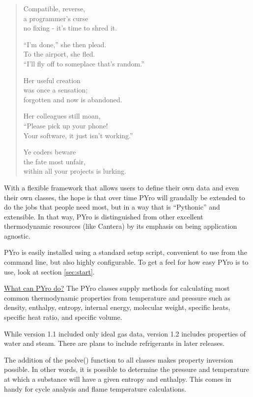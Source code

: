 \begin{verse}
Compatible, reverse,\\
a programmer's curse\\
no fixing - it's time to shred it.

``I'm done,'' she then plead.\\
To the airport, she fled.\\
``I'll fly off to someplace that's random.''

Her useful creation\\
was once a sensation;\\
forgotten and now is abandoned.

Her colleagues still moan,\\
``Please pick up your phone!\\
Your software, it just isn't working.''

Ye coders beware\\
the fate most unfair,\\
within all your projects is lurking.
\end{verse}

With a flexible framework that allows users to define their own data and even their own classes, the hope is that over time PYro will graudally be extended to do the jobs that people need most, but in a way that is ``Pythonic'' and extensible.  In that way, PYro is distinguished from other excellent thermodynamic resources (like Cantera) by its emphasis on being application agnostic.  

PYro is easily installed using a standard setup script, convenient to use from the command line, but also highly configurable.  To get a feel for how easy PYro is to use, look at section \ref{sec:start}.

\underline{What can PYro do?}  The PYro classes supply methods for calculating most common thermodynamic properties from temperature and pressure such as density, enthalpy, entropy, internal energy, molecular weight, specific heats, specific heat ratio, and specific volume.

While version 1.1 included only ideal gas data, version 1.2 includes properties of water and steam.  There are plans to include refrigerants in later releases.

The addition of the psolve() function to all classes makes property inversion possible.  In other words, it is possible to determine the pressure and temperature at which a substance will have a given entropy and enthalpy.  This comes in handy for cycle analysis and flame temperature calculations.


